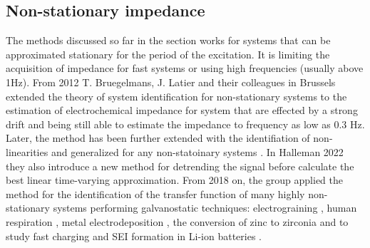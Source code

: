 \subsection{Non-stationary impedance}
The methods discussed so far in the section works for systems that can be approximated stationary for the period of the excitation. It is limiting the acquisition of impedance for fast systems or using high frequencies (usually above 1Hz). 
\label{sec:BLTVA}
From 2012 T. Bruegelmans, J. Latier and their colleagues in Brussels extended the theory of system identification for non-stationary systems to the estimation of electrochemical impedance \cite{breugelmansOddRandomPhase2012}  for system that are effected by a strong drift and being still able to estimate the impedance to frequency as low as 0.3 Hz. 
Later, the method has been further extended with the identifiation of non-linearities \cite{hallemansNonparametricIdentificationLinear2020} \cite{hallemansDetectionClassificationQuantification2021} and generalized for any non-statoinary systems \cite{hallemansBestLinearTimeVarying2021}. In Halleman 2022 they also introduce a new method for detrending the signal before calculate the best linear time-varying approximation.
From 2018 on, the group applied the method for the identification of the transfer function of many highly non-stationary systems performing galvanostatic techniques: electrograining \cite{woutersUseInstantaneousImpedance2018}, human respiration \cite{battistelHarmonicAnalysisSeparation2021},  metal electrodeposition \cite{colletOperandoORPEISStudy2021} \cite{dabirihavighOperandoOddRandom2022}, the conversion of zinc to zirconia \cite{dabirihavighOperandoOddRandom2023} and to study fast charging \cite{hallemansOperandoElectrochemicalImpedance2022}and SEI formation in Li-ion batteries \cite{dabirihavighOperandoORPEISMonitoring2025}.

